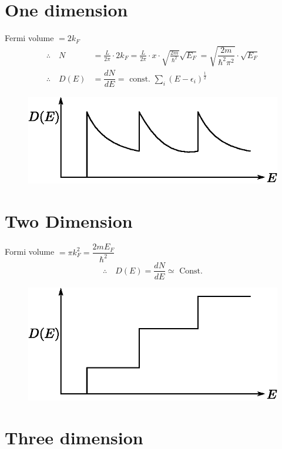 \section*{One dimension}

Fermi volume $=2k_{F}$
\begin{align*}
\therefore\quad N &= \frac{L}{2\pi}\cdot 2k_{F}=\frac{L}{2\pi}\cdot x\cdot \sqrt{\frac{2m}{\hbar^{2}}}\sqrt{E_{F}}=\sqrt{\dfrac{2m}{\hbar^{2}\pi^{2}}}\cdot \sqrt{E_{F}}\\
\therefore\quad D(E) &= \dfrac{dN}{dE}=\text{ const. } \sum\limits_{i}(E-\epsilon_{i})^{\frac{1}{2}}
\end{align*}
\begin{figure}[H]
\centering
\includegraphics[scale=.8]{images/lecture25/fig3.eps}
\end{figure}

\section*{Two Dimension}

Formi volume $=\pi k^{2}_{F}=\dfrac{2m E_{F}}{\hbar^{2}}$
$$
\therefore\quad D(E)=\dfrac{dN}{dE}\simeq \text{ Const.}
$$
\begin{figure}[H]
\centering
\includegraphics[scale=.8]{images/lecture25/fig4.eps}
\end{figure}

\section*{Three dimension}

